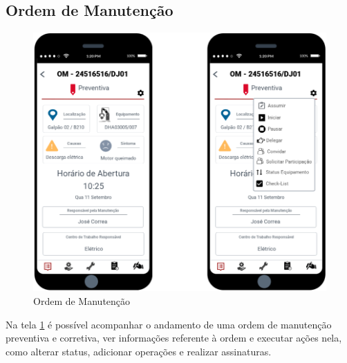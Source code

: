 \subsection{Ordem de Manutenção}

\begin{figure}[H]
	\caption{\label{mobile_om}Ordem de Manutenção}
	\begin{center}
		\includegraphics[scale=0.70]{./Figuras/mobile/om.png}
	\end{center}
\end{figure}

Na tela \ref{mobile_om} é possível acompanhar o andamento de uma ordem de manutenção preventiva e corretiva, ver informações referente à ordem e executar ações nela, como alterar status, adicionar operações e realizar assinaturas.